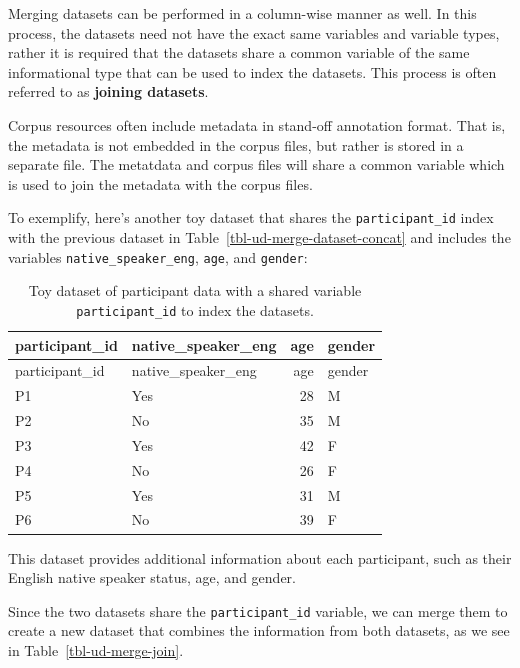 \documentclass[
  letterpaper,
  DIV=11,
  numbers=noendperiod]{scrreport}
\theoremstyle{definition}
\theoremstyle{remark}
\begin{document}
Merging datasets can be performed in a column-wise manner as well. In
this process, the datasets need not have the exact same variables and
variable types, rather it is required that the datasets share a common
variable of the same informational type that can be used to index the
datasets. This process is often referred to as \textbf{joining
datasets}.

Corpus resources often include metadata in stand-off annotation format.
That is, the metadata is not embedded in the corpus files, but rather is
stored in a separate file. The metatdata and corpus files will share a
common variable which is used to join the metadata with the corpus
files.

To exemplify, here's another toy dataset that shares the
\texttt{participant\_id} index with the previous dataset in
Table~\ref{tbl-ud-merge-dataset-concat} and includes the variables
\texttt{native\_speaker\_eng}, \texttt{age}, and \texttt{gender}:

\hypertarget{tbl-ud-merge-vars-participant}{}
\begin{longtable}[]{@{}llrl@{}}
\caption{\label{tbl-ud-merge-vars-participant}Toy dataset of participant
data with a shared variable \texttt{participant\_id} to index the
datasets.}\tabularnewline
\toprule\noalign{}
participant\_id & native\_speaker\_eng & age & gender \\
\midrule\noalign{}
\endfirsthead
\toprule\noalign{}
participant\_id & native\_speaker\_eng & age & gender \\
\midrule\noalign{}
\endhead
\bottomrule\noalign{}
\endlastfoot
P1 & Yes & 28 & M \\
P2 & No & 35 & M \\
P3 & Yes & 42 & F \\
P4 & No & 26 & F \\
P5 & Yes & 31 & M \\
P6 & No & 39 & F \\
\end{longtable}

This dataset provides additional information about each participant,
such as their English native speaker status, age, and gender.

Since the two datasets share the \texttt{participant\_id} variable, we
can merge them to create a new dataset that combines the information
from both datasets, as we see in Table~\ref{tbl-ud-merge-join}.
\end{document}
